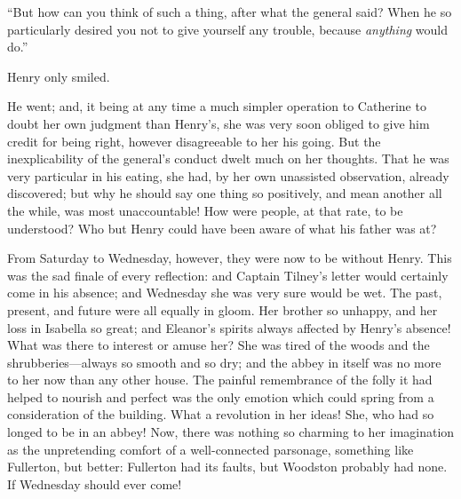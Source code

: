 
“But how can you think of such a thing, after what the general said? When he so particularly desired you not to give yourself any trouble, because {\em anything} would do.”

Henry only smiled. 


He went; and, it being at any time a much simpler operation to Catherine to doubt her own judgment than Henry's, she was very soon obliged to give him credit for being right, however disagreeable to her his going. But the inexplicability of the general's conduct dwelt much on her thoughts. That he was very particular in his eating, she had, by her own unassisted observation, already discovered; but why he should say one thing so positively, and mean another all the while, was most unaccountable! How were people, at that rate, to be understood? Who but Henry could have been aware of what his father was at?

From Saturday to Wednesday, however, they were now to be without Henry. This was the sad finale of every reflection: and Captain Tilney's letter would certainly come in his absence; and Wednesday she was very sure would be wet. The past, present, and future were all equally in gloom. Her brother so unhappy, and her loss in Isabella so great; and Eleanor's spirits always affected by Henry's absence! What was there to interest or amuse her? She was tired of the woods and the shrubberies---always so smooth and so dry; and the abbey in itself was no more to her now than any other house. The painful remembrance of the folly it had helped to nourish and perfect was the only emotion which could spring from a consideration of the building. What a revolution in her ideas! She, who had so longed to be in an abbey! Now, there was nothing so charming to her imagination as the unpretending comfort of a well-connected parsonage, something like Fullerton, but better: Fullerton had its faults, but Woodston probably had none. If Wednesday should ever come!

